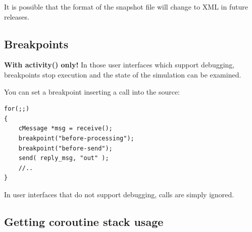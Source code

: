 It is possible that the format of the snapshot file will change to XML
in future {\opp} releases.



\subsection{Breakpoints}

\textbf{With activity() only!} In those user interfaces which support
debugging, breakpoints stop execution and the state of the simulation
can be examined.

You can set a breakpoint inserting a
 call into the source:

\begin{verbatim}
for(;;)
{
    cMessage *msg = receive();
    breakpoint("before-processing");
    breakpoint("before-send");
    send( reply_msg, "out" );
    //..
}
\end{verbatim}


In user interfaces that do not support debugging, 
calls are simply ignored.





%
%
%
%





\subsection{Getting coroutine stack usage}

